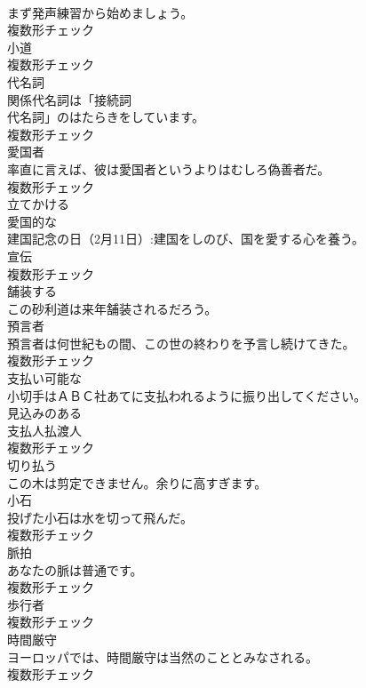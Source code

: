 \documentclass[8pt]{extreport}
\begin{document}
\begin{CJK}{UTF8}{min}
\\	まず発声練習から始めましょう。	
\\	複数形チェック
\\	[名詞]	小道	
\\	複数形チェック
\\	[名詞]	代名詞	
\\	関係代名詞は「接続詞
\\	代名詞」のはたらきをしています。	
\\	複数形チェック
\\	[名詞]	愛国者	
\\	率直に言えば、彼は愛国者というよりはむしろ偽善者だ。	
\\	複数形チェック
\\	[動詞]	立てかける	
\\	[形容詞]	愛国的な	
\\	建国記念の日（2月11日）:建国をしのび、国を愛する心を養う。	
\\	[名詞]	宣伝	
\\	複数形チェック
\\	[動詞]	舗装する	
\\	この砂利道は来年舗装されるだろう。	
\\	[名詞]	預言者	
\\	預言者は何世紀もの間、この世の終わりを予言し続けてきた。	
\\	複数形チェック
\\	[形容詞]	支払い可能な	
\\	小切手はＡＢＣ社あてに支払われるように振り出してください。	
\\	[形容詞]	見込みのある	
\\	[名詞]	支払人払渡人	
\\	複数形チェック
\\	[動詞]	切り払う	
\\	この木は剪定できません。余りに高すぎます。	
\\	[名詞]	小石	
\\	投げた小石は水を切って飛んだ。	
\\	複数形チェック
\\	[名詞]	脈拍	
\\	あなたの脈は普通です。	
\\	複数形チェック
\\	[名詞]	歩行者	
\\	複数形チェック
\\	[名詞]	時間厳守	
\\	ヨーロッパでは、時間厳守は当然のこととみなされる。	
\\	複数形チェック

\end{CJK}
\end{document}
